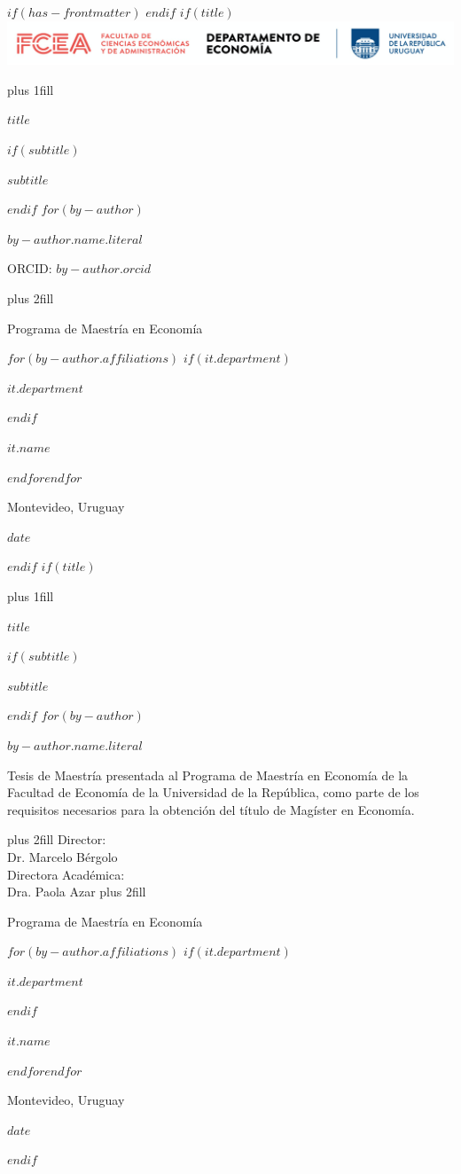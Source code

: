 $if(has-frontmatter)$
\frontmatter
$endif$
$if(title)$
\cleardoublepage
\thispagestyle{empty}
\includegraphics[width=\textwidth]{logo_udelar.png}
{\centering
\hbox{}\vskip 0cm plus 1fill
{\Huge\bfseries $title$ \par}
$if(subtitle)$
\vspace{3ex}
{\Large\bfseries $subtitle$ \par}
$endif$
\vspace{12ex}
$for(by-author)$
{\Large\bfseries $by-author.name.literal$ \par}
\vspace{3ex}
{ORCID: $by-author.orcid$ \par}
\vskip 0cm plus 2fill
{\large Programa de Maestría en Economía
\par}
$for(by-author.affiliations)$%
$if(it.department)$%
{\large $it.department$ \par}
$endif$%
{\large $it.name$ \par}
$endfor$$endfor$%
\vspace{3ex}
{\large Montevideo, Uruguay\par}
{\large $date$ \par}
\vspace{12ex}
{\small \par}
}
$endif$
$if(title)$
\cleardoublepage
\thispagestyle{empty}
{\centering
\hbox{}\vskip 0cm plus 1fill
{\Huge\bfseries $title$ \par}
$if(subtitle)$
\vspace{3ex}
{\Large\bfseries $subtitle$ \par}
$endif$
\vspace{12ex}
$for(by-author)$
{\Large\bfseries $by-author.name.literal$ \par}
\vspace{3ex}
}
{Tesis de Maestría presentada al Programa de Maestría en Economía de 
la Facultad de Economía de la Universidad de la República, como parte de los 
requisitos necesarios para la obtención del título de Magíster en Economía. 
\par}
{\centering
\vskip 0cm plus 2fill
{Director:\\Dr. Marcelo Bérgolo\\Directora Académica:\\Dra. Paola Azar}
\vskip 0cm plus 2fill
{\large Programa de Maestría en Economía
\par}
$for(by-author.affiliations)$%
$if(it.department)$%
{\large $it.department$ \par}
$endif$%
{\large $it.name$ \par}
$endfor$$endfor$%
\vspace{3ex}
{\large Montevideo, Uruguay\par}
{\large $date$ \par}
\vspace{12ex}
{\small \par}
}
$endif$
